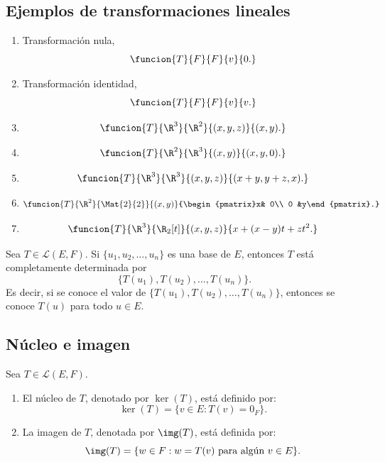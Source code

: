 \documentclass[a4,11pt]{aleph-notas}
\begin{document}
\subsection{Ejemplos de transformaciones lineales}
\begin{enumerate}
\item 
    Transformación nula, \[\funcion{T}{F}{F}{v}{0.}\]
\item 
    Transformación identidad, \[\funcion{T}{F}{F}{v}{v.}\]
\item 
    \[
        \funcion{T}{\R^3}{\R^2}
            {(x,y,z)}{(x, y).}
    \]
\item 
    \[
        \funcion{T}{\R^2}{\R^3}
            {(x,y)}{(x, y,0).}
    \]
\item 
    \[
        \funcion{T}{\R^3}{\R^3}
            {(x,y,z)}{(x+y, y + z,x).}
    \]
\item 
    \[
        \funcion{T}{\R^2}{\Mat{2}{2}}
            {(x,y)}{\begin{pmatrix}x& 0\\ 0 &y\end{pmatrix}.}
    \]
\item 
    \[
        \funcion{T}{\R^3}{\R_2[t]}
            {(x,y,z)}{x+(x-y)t + zt^2.}
    \]
\end{enumerate}



\begin{teo}
    Sea $T \in \mathcal{L}(E,F)$. Si $\{u_1,u_2,\ldots,u_n\}$ es una base de $E$, entonces $T$ está completamente determinada por
    \[
        \{T(u_1),T(u_2),\ldots,T(u_n)\}.
    \]
    Es decir, si se conoce el valor de $\{T(u_1),T(u_2),\ldots,T(u_n)\}$, entonces se conoce $T(u)$ para todo $u\in E$.
\end{teo}


\subsection{Núcleo e imagen}

\begin{defi}
    Sea $T \in \mathcal{L}(E,F)$.
    \begin{enumerate}
    \item 
        El núcleo de $T$, denotado por $\ker(T)$, está definido por:
        \[
            \ker(T) = \{v \in E: T(v) = 0_F\}.
        \]
    \item 
        La imagen de $T$, denotada por $\img(T)$, está definida por:
        \[
            \img(T) = \{ w \in F: w = T(v) \text{ para algún } v \in E\}.
        \]
    \end{enumerate}
\end{defi}
\end{document}
